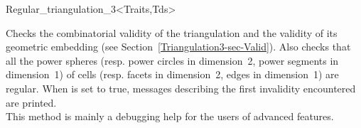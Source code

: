 \begin{ccClassTemplate}{Regular_triangulation_3<Traits,Tds>}
\begin{ccAdvanced}
{Checks the combinatorial validity of the triangulation and the
validity of its geometric embedding (see
Section~\ref{Triangulation3-sec-Valid}). Also checks that all the
power spheres (resp. power circles in dimension~2, power segments in
dimension~1) of cells (resp. facets in dimension~2, edges in
dimension~1) are regular. When 
is set to true, messages describing the first invalidity encountered
are printed.\\ This method is mainly a debugging help for the users of
advanced features.
}
\end{ccAdvanced}

\end{ccClassTemplate}











